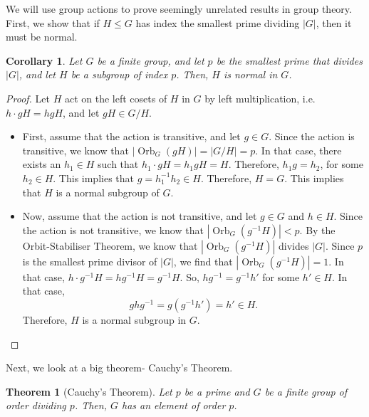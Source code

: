 \documentclass[a4paper, openany]{memoir}
\theoremstyle{definition}
\theoremstyle{plain}
\newtheorem{theorem}[definition]{Theorem}
\newtheorem{corollary}[definition]{Corollary}
\begin{document}
We will use group actions to prove seemingly unrelated results in group theory. First, we show that if $H \leqslant G$ has index the smallest prime dividing $|G|$, then it must be normal.
\begin{corollary}
Let $G$ be a finite group, and let $p$ be the smallest prime that divides $|G|$, and let $H$ be a subgroup of index $p$. Then, $H$ is normal in $G$.
\end{corollary}
\begin{proof}
Let $H$ act on the left cosets of $H$ in $G$ by left multiplication, i.e. $h \cdot gH = hgH$, and let $gH \in G/H$.
\begin{itemize}
    \item First, assume that the action is transitive, and let $g \in G$. Since the action is transitive, we know that $|\operatorname{Orb}_G(gH)| = |G/H| = p$. In that case, there exists an $h_1 \in H$ such that $h_1 \cdot gH = h_1 gH = H$. Therefore, $h_1g = h_2$, for some $h_2 \in H$. This implies that $g = h_1^{-1}h_2 \in H$. Therefore, $H = G$. This implies that $H$ is a normal subgroup of $G$.
    
    \item Now, assume that the action is not transitive, and let $g \in G$ and $h \in H$. Since the action is not transitive, we know that $|\operatorname{Orb}_G(g^{-1} H)| < p$. By the Orbit-Stabiliser Theorem, we know that $|\operatorname{Orb}_G(g^{-1} H)|$ divides $|G|$. Since $p$ is the smallest prime divisor of $|G|$, we find that $|\operatorname{Orb}_G(g^{-1} H)| = 1$. In that case, $h \cdot g^{-1}H = hg^{-1} H = g^{-1} H$. So, $hg^{-1} = g^{-1}h'$ for some $h' \in H$. In that case,
    \[ghg^{-1} = g(g^{-1}h') = h' \in H.\]
    Therefore, $H$ is a normal subgroup in $G$.
\end{itemize}
\end{proof}
\noindent Next, we look at a big theorem- Cauchy's Theorem.
\begin{theorem}[Cauchy's Theorem]
Let $p$ be a prime and $G$ be a finite group of order dividing $p$. Then, $G$ has an element of order $p$.
\end{theorem}
\end{document}
